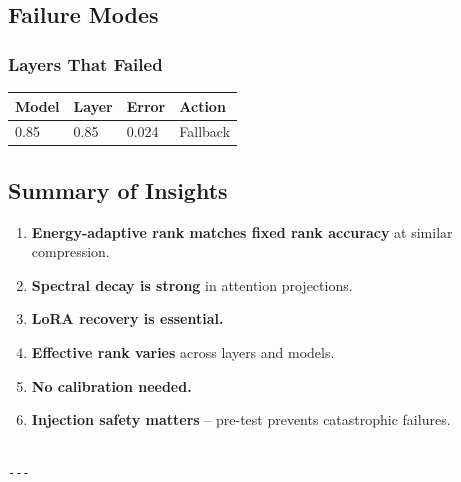 \subsection{Failure Modes}

\subsubsection{Layers That Failed}

\begin{table}[H]
\centering
\small
\begin{tabular}{llll}
\toprule
\textbf{Model} & \textbf{Layer} & \textbf{Error} & \textbf{Action} \\
\midrule
0.85 & 0.85 & 0.024 & Fallback \\
\bottomrule
\end{tabular}
\end{table}

\subsection{Summary of Insights}

\begin{enumerate}
\item \textbf{Energy-adaptive rank matches fixed rank accuracy} at similar compression.
\item \textbf{Spectral decay is strong} in attention projections.
\item \textbf{LoRA recovery is essential.}
\item \textbf{Effective rank varies} across layers and models.
\item \textbf{No calibration needed.}
\item \textbf{Injection safety matters} -- pre-test prevents catastrophic failures.
\end{enumerate}
\begin{lstlisting}

---
\end{lstlisting}